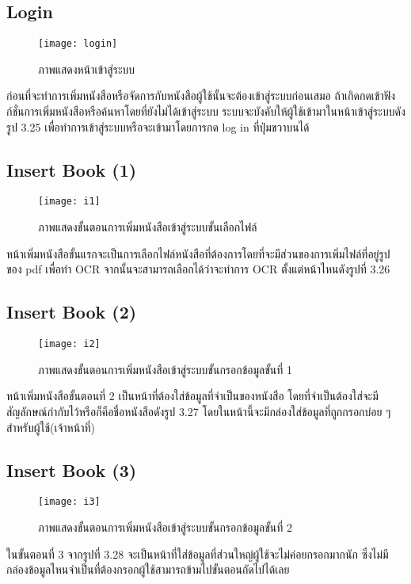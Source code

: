 \subsection{Login}
\begin{figure}[H]
    \centering
    \texttt{[image: login]}
    \caption{ภาพแสดงหน้าเข้าสู่ระบบ}\label{fig:scene7}
\end{figure}
ก่อนที่จะทำการเพิ่มหนังสือหรือจัดการกับหนังสือผู้ใช้นั้นจะต้องเข้าสู่ระบบก่อนเสมอ ถ้าเกิดกดเข้าฟังก์ชั่นการเพิ่มหนังสือหรือค้นหาโดยที่ยังไม่ได้เข้าสู่ระบบ ระบบจะบังคับให้ผู้ใช้เข้ามาในหน้าเข้าสู่ระบบดังรูป 3.25 เพื่อทำการเข้าสู่ระบบหรือจะเข้ามาโดยการกด log in ที่ปุ่มขวาบนได้

\subsection{Insert Book (1)}
\begin{figure}[H]
    \centering
    \texttt{[image: i1]}
    \caption{ภาพแสดงขั้นตอนการเพิ่มหนังสือเข้าสู่ระบบขั้นเลือกไฟล์}\label{fig:i1}
\end{figure}
หน้าเพิ่มหนังสือขั้นแรกจะเป็นการเลือกไฟล์หนังสือที่ต้องการโดยที่จะมีส่วนของการเพิ่มไฟล์ที่อยู่รูปของ pdf เพื่อทำ OCR จากนั้นจะสามารถเลือกได้ว่าจะทำการ OCR ตั้งแต่หน้าไหนดังรูปที่ 3.26

\subsection{Insert Book (2) }
\begin{figure}[H]
    \centering
    \texttt{[image: i2]}
    \caption{ภาพแสดงขั้นตอนการเพิ่มหนังสือเข้าสู่ระบบขั้นกรอกข้อมูลขั้นที่ 1}\label{fig:i2}
\end{figure}
หน้าเพิ่มหนังสือขั้นตอนที่ 2 เป็นหน้าที่ต้องใส่ข้อมูลที่จำเป็นของหนังสือ โดยที่จำเป็นต้องใส่จะมีสัญลักษณ์กำกับไว้หรือก็คือชื่อหนังสือดังรูป 3.27 โดยในหน้านี้จะมีกล่องใส่ข้อมูลที่ถูกกรอกบ่อย ๆสำหรับผู้ใช้(เจ้าหน้าที่)

\subsection{Insert Book (3)}
\begin{figure}[H]
    \centering
    \texttt{[image: i3]}
    \caption{ภาพแสดงขั้นตอนการเพิ่มหนังสือเข้าสู่ระบบขั้นกรอกข้อมูลขั้นที่ 2}\label{fig:i3}
\end{figure}
ในขั้นตอนที่ 3 จากรูปที่ 3.28 จะเป็นหน้าที่ใส่ข้อมูลที่ส่วนใหญ่ผู้ใช้จะไม่ค่อยกรอกมากนัก ซึ่งไม่มีกล่องข้อมูลไหนจำเป็นที่ต้องกรอกผู้ใช้สามารถข้ามไปขั้นตอนถัดไปได้เลย

